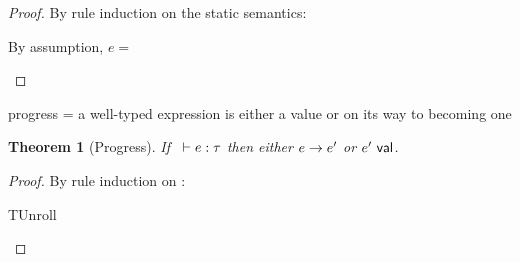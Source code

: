 \documentclass{article}
\DeclareMathOperator{\expand}{\text{\normalfont expand}}
\newtheorem{Theorem}{Theorem}
\begin{document}
\begin{proof}
  By rule induction on the static semantics:
  \begin{byCases}
    \case{\TRoll}
    By assumption, $e = $
    \case{\TUnroll}
  \end{byCases}
\end{proof}





\noindent
progress = a well-typed expression is either a value or on its way to becoming one

\resetpfcounter
\begin{Theorem}[Progress]
  If \usepfcounter[e types]~$\hastype{e}{\tau}$
  then either $e \rightarrow e'$
  or $e'~\mathsf{\normalfont val}$.
\end{Theorem}

\begin{proof}
  By rule induction on :
  \begin{byCases}
    \item[TUnroll]
  \end{byCases}
\end{proof}
\end{document}
